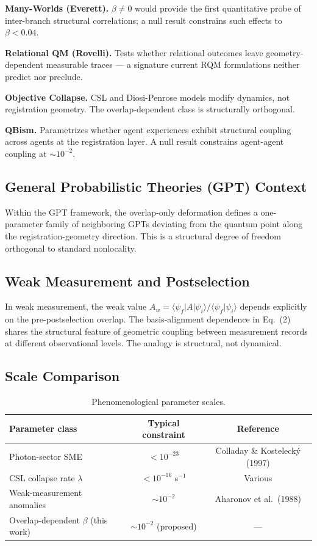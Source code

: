 \documentclass[12pt]{article}
\begin{document}
\textbf{Many-Worlds (Everett).} $\beta \neq 0$ would provide the first quantitative probe of inter-branch structural correlations; a null result constrains such effects to $\beta < 0.04$.

\textbf{Relational QM (Rovelli).} Tests whether relational outcomes leave geometry-dependent measurable traces --- a signature current RQM formulations neither predict nor preclude.

\textbf{Objective Collapse.} CSL and Diosi-Penrose models modify dynamics, not registration geometry. The overlap-dependent class is structurally orthogonal.

\textbf{QBism.} Parametrizes whether agent experiences exhibit structural coupling across agents at the registration layer. A null result constrains agent-agent coupling at $\sim\!10^{-2}$.

\subsection{General Probabilistic Theories (GPT) Context}

Within the GPT framework, the overlap-only deformation defines a one-parameter family of neighboring GPTs deviating from the quantum point along the registration-geometry direction. This is a structural degree of freedom orthogonal to standard nonlocality.

\subsection{Weak Measurement and Postselection}

In weak measurement, the weak value $A_w = \langle \psi_f | A | \psi_i \rangle / \langle \psi_f | \psi_i \rangle$ depends explicitly on the pre-postselection overlap. The basis-alignment dependence in Eq.~(2) shares the structural feature of geometric coupling between measurement records at different observational levels. The analogy is structural, not dynamical.

\subsection{Scale Comparison}

\begin{table}[h]
\centering
\caption{Phenomenological parameter scales.}
\begin{tabular}{lcc}
\toprule
Parameter class & Typical constraint & Reference \\
\midrule
Photon-sector SME & ${<}10^{-23}$ & Colladay \& Kosteleck\'y (1997) \\
CSL collapse rate $\lambda$ & ${<}10^{-16}$ s${}^{-1}$ & Various \\
Weak-measurement anomalies & $\sim\!10^{-2}$ & Aharonov et al.\ (1988) \\
Overlap-dependent $\beta$ (this work) & $\sim\!10^{-2}$ (proposed) & --- \\
\bottomrule
\end{tabular}
\end{table}
\end{document}
